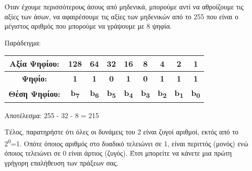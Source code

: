 Όταν έχουμε περισσότερους άσους από μηδενικά, μπορούμε αντί να αθροίζουμε τις αξίες των άσων, να αφαιρέσουμε τις αξίες των μηδενικών από το 255 που είναι ο μέγιστος αριθμός που μπορούμε να γράψουμε με 8 ψηφία.

Παράδειγμα:

\begin{center}
\begin{tabular}{|c|c|c|c|c|c|c|c|c|}
\hline
Αξία Ψηφίου: & 128 & 64 & 32 & 16 & 8 & 4 & 2 & 1 \\
\hline
\textbf{Ψηφίο:} & \textbf{1} & \textbf{1} & \textbf{0} & \textbf{1} & \textbf{0} & \textbf{1} & \textbf{1} & \textbf{1} \\
\hline
\textbf{Θέση Ψηφίου:} & \textbf{b\textsubscript{7}}& \textbf{b\textsubscript{6}} & \textbf{b\textsubscript{5}} & \textbf{b\textsubscript{4}} & \textbf{b\textsubscript{3}}& \textbf{b\textsubscript{2}} & \textbf{b\textsubscript{1}} & \textbf{b\textsubscript{0}}  \\
\hline
\end{tabular}

Αποτέλεσμα: 255 - 32 - 8 = 215 
\end{center}

Τέλος, παρατηρήστε ότι όλες οι δυνάμεις του 2 είναι ζυγοί αριθμοί, εκτός από το 2\textsuperscript{0}=1. Οπότε όποιος αριθμός στο δυαδικό τελειώνει σε 1, είναι περιττός (μονός) ενώ όποιος τελειώνει σε 0 είναι άρτιος (ζυγός). Έτσι μπορείτε να κάνετε μια πρώτη γρήγορη επαλήθευση των πράξεων σας.